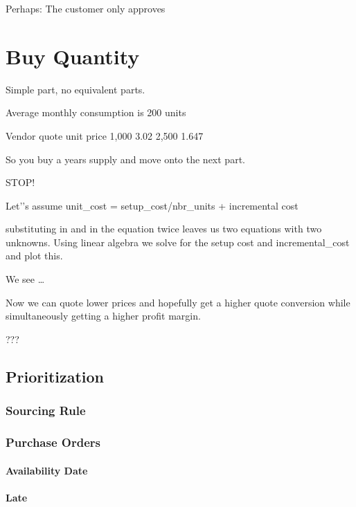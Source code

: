 \documentclass[letterpaper,10pt,english]{sphinxmanual}
\begin{document}
Perhaps: The customer only approves


\chapter{Buy Quantity}
\label{\detokenize{BusinessProcessReengineering:buy-quantity}}
Simple part, no equivalent parts.

Average monthly consumption is 200 units

Vendor quote unit price 1,000 3.02 2,500 1.647

So you buy a years supply and move onto the next part.

STOP!

Let’’s assume unit\_cost = setup\_cost/nbr\_units + incremental cost

substituting in  and  in the equation twice
leaves us two equations with two unknowns. Using linear algebra we solve
for the setup cost and incremental\_cost and plot this.

We see …

Now we can quote lower prices and hopefully get a higher quote
conversion while simultaneously getting a higher profit margin.

???


\section{Prioritization}
\label{\detokenize{BusinessProcessReengineering:prioritization}}

\subsection{Sourcing Rule}
\label{\detokenize{BusinessProcessReengineering:sourcing-rule}}

\subsection{Purchase Orders}
\label{\detokenize{BusinessProcessReengineering:purchase-orders}}

\subsubsection{Availability Date}
\label{\detokenize{BusinessProcessReengineering:availability-date}}

\subsubsection{Late}
\label{\detokenize{BusinessProcessReengineering:late}}
\end{document}
